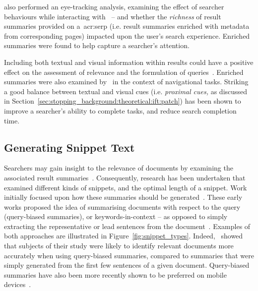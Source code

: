 \cite{marcos2015snippets_web_search} also performed an eye-tracking analysis, examining the effect of searcher behaviours while interacting with~ -- and whether the \emph{richness} of result summaries provided on a~\gls{acr:serp} (i.e. result summaries enriched with metadata from corresponding pages) impacted upon the user's search experience. Enriched summaries were found to help capture a searcher's attention.

Including both textual and visual information within results could have a positive effect on the assessment of relevance and the formulation of queries~\citep{joho2006presentation}. Enriched summaries were also examined by~\cite{ali2009interaction_interfaces} in the context of navigational tasks. Striking a good balance between textual and visual cues (i.e. \emph{proximal cues,} as discussed in Section~\ref{sec:stopping_background:theoretical:ift:patch}) has been shown to improve a searcher's ability to complete tasks, and reduce search completion time.

\subsection{Generating Snippet Text}\label{chap:snippets:background:generating}
Searchers may gain insight to the relevance of documents by examining the associated result summaries~\citep{he2012bridging}. Consequently, research has been undertaken that examined different kinds of snippets, and the optimal length of a snippet. Work initially focused upon how these summaries should be generated~\citep{pedersen1991snippet, landauer1993enhancing, tombros1998query_biased, white2003task, leal2015query}. These early works proposed the idea of summarising documents with respect to the query (query-biased summaries), or keywords-in-context -- as opposed to simply extracting the representative or lead sentences from the document~\citep{kupiec1995tds}. Examples of both approaches are illustrated in Figure~\ref{fig:snippet_types}. Indeed,~\cite{tombros1998query_biased} showed that subjects of their study were likely to identify relevant documents more accurately when using query-biased summaries, compared to summaries that were simply generated from the first few sentences of a given document. Query-biased summaries have also been more recently shown to be preferred on mobile devices~\citep{spirin2016snippets}.

